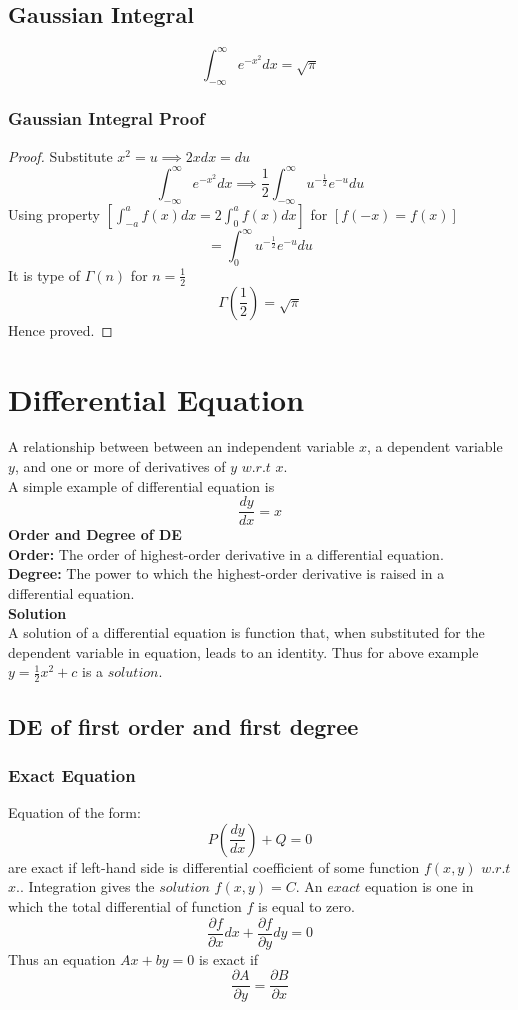 \documentclass[12pt]{article}
\begin{document}
\subsection{Gaussian Integral}
$$\int_{-\infty}^{\infty}e^{-x^{2}}dx=\sqrt{\pi}$$
\subsubsection{Gaussian Integral Proof}
\begin{proof}
Substitute $x^2=u \implies 2xdx=du$ \\
$$\int_{-\infty}^{\infty}e^{-x^{2}}dx \implies \frac{1}{2}\int_{-\infty}^{\infty} u^{-\frac{1}{2}}e^{-u}du$$
Using property $[\int_{-a}^{a}f(x)dx=2 \int_{0}^{a}f(x)dx]$ for $[f(-x)=f(x)]$ \\
$$=\int_{0}^{\infty} u^{-\frac{1}{2}}e^{-u}du$$
It is type of $\Gamma(n)$ for $n=\frac{1}{2}$
$$\Gamma(\frac{1}{2})=\sqrt{\pi}$$
Hence proved.
\end{proof}
\section{Differential Equation}
A relationship between between an independent variable $x$, a dependent variable $y$, and one or more of derivatives of $y$ $w.r.t$ $x$. \\
A simple example of differential equation is \\
$$\frac{dy}{dx}=x$$
\textbf{Order and Degree of DE}\\
\textbf{Order:} The order of highest-order derivative in a differential equation. \\
\textbf{Degree:} The power to which the highest-order derivative is raised in a differential equation.\\
\textbf{Solution}\\
A solution of a differential equation is function that, when substituted for the dependent variable in equation, leads to an identity. Thus for above example $y=\frac{1}{2}x^2+c$ is a $solution.$
\subsection{DE of first order and first degree}
\subsubsection{Exact Equation}
Equation of the form: $$P(\frac{dy}{dx})+	Q=0$$ are exact if left-hand side is differential coefficient of some function $f(x,y)$ $w.r.t$ $x.$. Integration gives the $solution$ $f(x,y)=C$. An $exact$ equation is one in which the total differential of function $f$ is equal to zero.
$$\frac{\partial f}{\partial x}dx+\frac{\partial f}{\partial y}dy=0$$
Thus an equation $Ax+by=0$ is exact if
$$\frac{\partial A}{\partial y}=\frac{\partial B}{\partial x}$$
\end{document}
